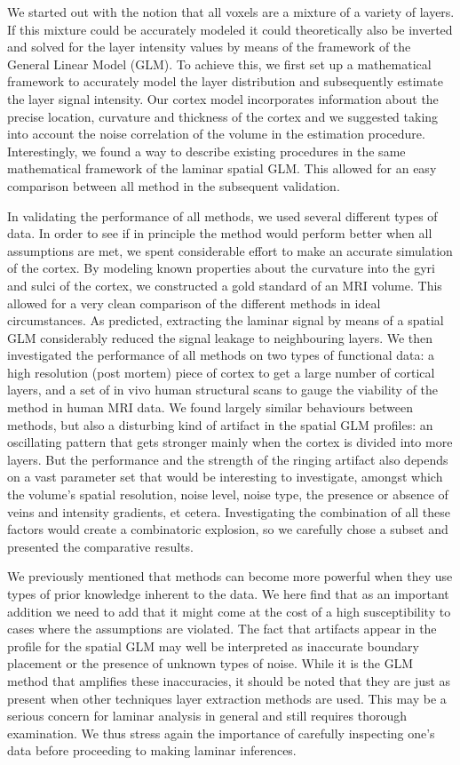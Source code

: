 We started out with the notion that all voxels are a mixture of a variety of layers. If this mixture could be accurately modeled it could theoretically also be inverted and solved for the layer intensity values by means of the framework of the General Linear Model (GLM). To achieve this, we first set up a mathematical framework to accurately model the layer distribution and subsequently estimate the layer signal intensity. Our cortex model incorporates information about the precise location, curvature and thickness of the cortex and we suggested taking into account the noise correlation of the volume in the estimation procedure. Interestingly, we found a way to describe existing procedures in the same mathematical framework of the laminar spatial GLM. This allowed for an easy comparison between all method in the subsequent validation.

In validating the performance of all methods, we used several different types of data. In order to see if in principle the method would perform better when all assumptions are met, we spent considerable effort to make an accurate simulation of the cortex. By modeling known properties about the curvature into the gyri and sulci of the cortex, we constructed a gold standard of an MRI volume. This allowed for a very clean comparison of the different methods in ideal circumstances. As predicted, extracting the laminar signal by means of a spatial GLM considerably reduced the signal leakage to neighbouring layers. We then investigated the performance of all methods on two types of functional data: a high resolution (post mortem) piece of cortex to get a large number of cortical layers, and a set of in vivo human structural scans to gauge the viability of the method in human MRI data. We found largely similar behaviours between methods, but also a disturbing kind of artifact in the spatial GLM profiles: an oscillating pattern that gets stronger mainly when the cortex is divided into more layers. But the performance and the strength of the ringing artifact also depends on a vast parameter set that would be interesting to investigate, amongst which the volume's spatial resolution, noise level, noise type, the presence or absence of veins and intensity gradients, et cetera. Investigating the combination of all these factors would create a combinatoric explosion, so we carefully chose a subset and presented the comparative results.

We previously mentioned that methods can become more powerful when they use types of prior knowledge inherent to the data. We here find that as an important addition we need to add that it might come at the cost of a high susceptibility to cases where the assumptions are violated. The fact that artifacts appear in the profile for the spatial GLM may well be interpreted as inaccurate boundary placement or the presence of unknown types of noise. While it is the GLM method that amplifies these inaccuracies, it should be noted that they are just as present when other techniques layer extraction methods are used. This may be a serious concern for laminar analysis in general and still requires thorough examination. We thus stress again the importance of carefully inspecting one's data before proceeding to making laminar inferences. 

